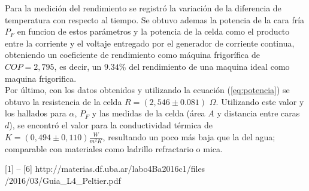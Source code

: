 \documentclass[twoside,twocolumn,a4paper]{article}
\begin{document}
Para la medici\'on del rendimiento se registr\'o la variaci\'on de la diferencia de temperatura con respecto al tiempo. Se obtuvo ademas la potencia de la cara fr\'ia $P_{F}$ en funcion de estos par\'ametros y la potencia de la celda como el producto entre la corriente y el voltaje entregado por el generador de corriente continua, obteniendo un coeficiente de rendimiento como m\'aquina frigor\'ifica de $COP = 2,795$, es decir, un $9.34 \%$ del rendimiento de una maquina ideal como maquina frigorifica.\\

Por \'ultimo, con los datos obtenidos y utilizando la ecuaci\'on (\ref{eq:potencia}) se obtuvo la resistencia de la celda $R = (2,546 \pm 0.081)$ $\Omega$. Utilizando este valor y los hallados para $\alpha$, $P_{F}$ y las medidas de la celda (\'area $A$ y distancia entre caras $d$), se encontr\'o el valor para la conductividad t\'ermica de  $K = (0,494 \pm 0,110) \frac{W}{m^{2} K}$, resultando un poco m\'as baja que la del agua; comparable con materiales como ladrillo refractario o mica.

\newpage
\begin{thebibliography}{99} %


[1] -- [6] http://materias.df.uba.ar/labo4Ba2016c1/files
           /2016/03/Guia\_L4\_Peltier.pdf
 
\end{thebibliography}


\end{document}
